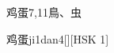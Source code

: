 \begin{entry}{鸡蛋}{7,11}{⿃、⾍}
  \begin{phonetics}{鸡蛋}{ji1dan4}[][HSK 1]
  \end{phonetics}
\end{entry}

